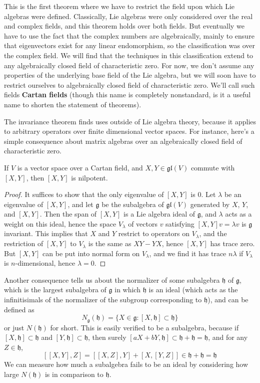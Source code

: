 This is the first theorem where we have to restrict the field upon which Lie algebras were defined. Classically, Lie algebras were only considered over the real and complex fields, and this theorem holds over both fields. But eventually we have to use the fact that the complex numbers are algebraically, mainly to ensure that eigenvectors exist for any linear endomorphism, so the classification was over the complex field. We will find that the techniques in this classification extend to any algebraically closed field of characteristic zero. For now, we don't assume any properties of the underlying base field of the Lie algebra, but we will soon have to restrict ourselves to algebraically closed field of characteristic zero. We'll call such fields {\bf Cartan fields} (though this name is completely nonstandard, is it a useful name to shorten the statement of theorems).

The invariance theorem finds uses outside of Lie algebra theory, because it applies to arbitrary operators over finite dimensional vector spaces. For instance, here's a simple consequence about matrix algebras over an algebraically closed field of characteristic zero.

\begin{theorem}
    If $V$ is a vector space over a Cartan field, and $X, Y \in \mathfrak{gl}(V)$ commute with $[X,Y]$, then $[X,Y]$ is nilpotent.
\end{theorem}
\begin{proof}
    It suffices to show that the only eigenvalue of $[X,Y]$ is 0. Let $\lambda$ be an eigenvalue of $[X,Y]$, and let $\mathfrak{g}$ be the subalgebra of $\mathfrak{gl}(V)$ generated by $X$, $Y$, and $[X,Y]$. Then the span of $[X,Y]$ is a Lie algebra ideal of $\mathfrak{g}$, and $\lambda$ acts as a weight on this ideal, hence the space $V_\lambda$ of vectors $v$ satisfying $[X,Y]v = \lambda v$ is $\mathfrak{g}$ invariant. This implies that $X$ and $Y$ restrict to operators on $V_\lambda$, and the restriction of $[X,Y]$ to $V_\lambda$ is the same as $XY - YX$, hence $[X,Y]$ has trace zero. But $[X,Y]$ can be put into normal form on $V_\lambda$, and we find it has trace $n \lambda$ if $V_\lambda$ is $n$-dimensional, hence $\lambda = 0$.
\end{proof}

Another consequence tells us about the normalizer of some subalgebra $\mathfrak{h}$ of $\mathfrak{g}$, which is the largest subalgebra of $\mathfrak{g}$ in which $\mathfrak{h}$ is an ideal (which acts as the infinitisimals of the normalizer of the subgroup corresponding to $\mathfrak{h}$), and can be defined as
%
\[ N_\mathfrak{g}(\mathfrak{h}) = \{ X \in \mathfrak{g}: [X,\mathfrak{h}] \subset \mathfrak{h} \} \]
%
or just $N(\mathfrak{h})$ for short. This is easily verified to be a subalgebra, because if $[X,\mathfrak{h}] \subset \mathfrak{h}$ and $[Y, \mathfrak{h}] \subset \mathfrak{h}$, then surely $[aX + bY, \mathfrak{h}] \subset \mathfrak{h} + \mathfrak{h} = \mathfrak{h}$, and for any $Z \in \mathfrak{h}$,
%
\[ [[X,Y], Z] = [[X,Z],Y] + [X,[Y,Z]] \in \mathfrak{h} + \mathfrak{h} = \mathfrak{h} \]
%
We can measure how much a subalgebra fails to be an ideal by considering how large $N(\mathfrak{h})$ is in comparison to $\mathfrak{h}$.

